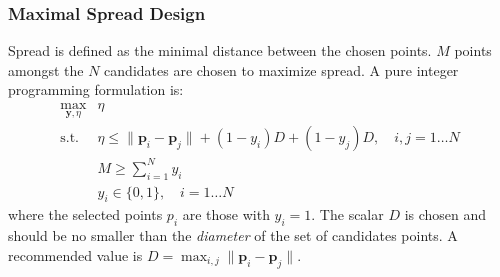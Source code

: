 \documentclass{article}
\begin{document}
	\subsubsection{Maximal Spread Design}
	Spread is defined as the minimal distance between the chosen points. $M$ points amongst the $N$ candidates are chosen to maximize spread. A pure integer programming formulation is:
	\begin{align}
		\max_{\mathbf{y}, \eta} & \eta  \\
		\text{s.t. } 			& \eta \leq \lVert \mathbf{p}_i - \mathbf{p}_j \rVert + (1 - y_i) D + (1 - y_j) D, \quad i,j = 1 \dots N  \\
								& M \geq \sum_{i=1}^N y_i  \\
								& y_i \in \{0, 1\}, \quad i = 1 \dots N
	\end{align}
	where the selected points $p_i$ are those with $y_i = 1$. The scalar $D$ is chosen and should be no smaller than the \emph{diameter} of the set of candidates points. A recommended value is $D= \max_{i,j} \lVert \mathbf{p}_i - \mathbf{p}_j \rVert$.
	
\end{document}
